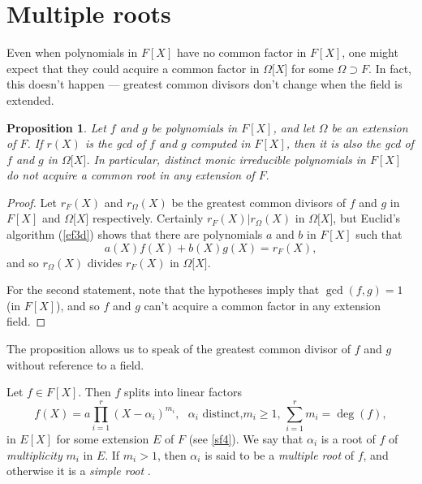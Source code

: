 \documentclass[a4paper,11pt,final,openany]{memoir}
\newtheorem{proposition}[X]{Proposition}
\theoremstyle{nonumberplain}
\newtheorem{proof}{Proof.}
\begin{document}
\section{Multiple roots}

Even when polynomials in $F[X]$ have no common factor in $F[X]$, one might
expect that they could acquire a common factor in $\Omega\lbrack X]$ for some
$\Omega\supset F$. In fact, this doesn't happen --- greatest common divisors
don't change when the field is extended.

\begin{proposition}
\label{ft1}Let $f$ and $g$ be polynomials in $F[X]$, and let $\Omega$ be an
extension of $F$. If $r(X)$ is the gcd of $f$ and $g$ computed in $F[X]$, then
it is also the gcd of $f$ and $g$ in $\Omega\lbrack X]$. In particular,
distinct monic irreducible polynomials in $F[X]$ do not acquire a common root
in any extension of $F.$
\end{proposition}

\begin{proof}
Let $r_{F}(X)$ and $r_{\Omega}(X)$ be the greatest common divisors of $f$ and
$g$ in $F[X]$ and $\Omega\lbrack X]$ respectively. Certainly $r_{F}%
(X)|r_{\Omega}(X)$ in $\Omega\lbrack X]$, but Euclid's algorithm (\ref{ef3d})
shows that there are polynomials $a$ and $b$ in $F[X]$ such that
\[
a(X)f(X)+b(X)g(X)=r_{F}(X),
\]
and so $r_{\Omega}(X)$ divides $r_{F}(X)$ in $\Omega\lbrack X]$.

For the second statement, note that the hypotheses imply that $\gcd(f,g)=1$
(in $F[X]$), and so $f$ and $g$ can't acquire a common factor in any extension field.
\end{proof}

The proposition allows us to speak of the greatest common divisor of $f$ and
$g$ without reference to a field.

Let $f\in F[X]$. Then $f$ splits into linear factors
\begin{equation}
f(X)=a\prod_{i=1}^{r}(X-\alpha_{i})^{m_{i}},\text{ }\alpha_{i}\text{ distinct,
}m_{i}\geq1\text{, }\sum_{i=1}^{r}m_{i}=\deg(f), \label{eq5}%
\end{equation}
in $E[X]$ for some extension $E$ of $F$ (see \ref{sf4}). We say that
$\alpha_{i}$ is a root of $f$ of \emph{multiplicity}%
$m_{i}$ in $E$. If $m_{i}>1$, then $\alpha_{i}$ is said to be a \emph{multiple
root }%
of $f$, and otherwise it is a \emph{simple root}%
%
.
\end{document}
